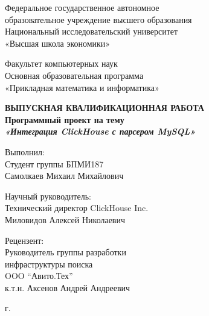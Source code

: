 \begin{titlepage}
\begin{center}

Федеральное государственное автономное\\
образовательное учреждение высшего образования\\
Национальный исследовательский университет\\
«Высшая школа экономики»

\vspace{10mm}
Факультет компьютерных наук\\
Основная образовательная программа\\
«Прикладная математика и информатика»

\vspace{20mm}

\textbf{\large ВЫПУСКНАЯ КВАЛИФИКАЦИОННАЯ РАБОТА}\\[3mm]

\textbf{\large Программный проект на тему}\\
\textbf{\textit{\large «Интеграция ClickHouse с парсером MySQL»}}

\vspace{20mm}

\begin{flushleft}
\begin{minipage}[t]{0.65\textwidth}
{Выполнил:} \\
Студент группы БПМИ187 \\
Самолкаев Михаил Михайлович
\vspace{10mm}

{Научный руководитель:} \\
Технический директор ClickHouse Inc.\\
Миловидов Алексей Николаевич
\vspace{10mm}

{Рецензент:} \\
Руководитель группы разработки\\
инфраструктуры поиска\\
OOO \enquote{Авито.Тех}\\
к.т.н. Аксенов Андрей Андреевич
\end{minipage}
\end{flushleft}

\vfill 

\par{\the\year{} г.}
\end{center}
\end{titlepage}
\restoregeometry
\addtocounter{page}{1}
